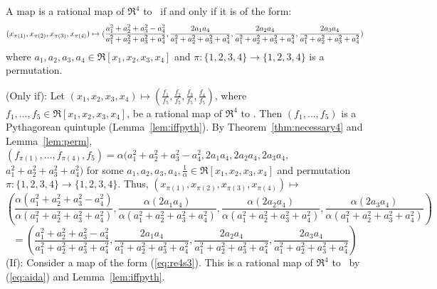 \begin{theorem}
\label{thm:map4}
A map is a rational map of $\Re^4$ to \ if and only if
it is of the form:
\begin{equation}
\label{eq:re4s3}
\footnotesize{(x_{\pi(1)},x_{\pi(2)},x_{\pi(3)},x_{\pi(4)})} \mapsto 
\footnotesize{(\frac{a_1^2 + a_2^2 + a_3^2 - a_4^2}{a_1^2 + a_2^2 + a_3^2 + a_4^2},
	 \frac{2a_1a_4}{a_1^2 + a_2^2 + a_3^2 + a_4^2},
	 \frac{2a_2a_4}{a_1^2 + a_2^2 + a_3^2 + a_4^2},
	 \frac{2a_3a_4}{a_1^2 + a_2^2 + a_3^2 + a_4^2})}
\end{equation}
where $a_1,a_2,a_3,a_4 \in \Re[x_1,x_2,x_3,x_4]$
and $\pi : \{1,2,3,4\} \rightarrow \{1,2,3,4\}$ is a permutation.
\end{theorem}
\prf
(Only if): Let $(x_1,x_2,x_3,x_4) \mapsto 
(\frac{f_1}{f_5},\frac{f_2}{f_5},\frac{f_3}{f_5},\frac{f_4}{f_5})$,
where $f_1,\ldots,f_5 \in \Re[x_1,x_2,x_3,x_4]$, be a rational map
of $\Re^4$ to .
Then $(f_1,\ldots,f_5)$ is a Pythagorean quintuple (Lemma~\ref{lem:iffpyth}).
By Theorem~\ref{thm:necessary4} and Lemma~\ref{lem:perm},
$(f_{\pi(1)},\ldots,f_{\pi(4)},f_5) = \alpha (a_1^2 + a_2^2 + a_3^2 - a_4^2,
2a_1a_4,2a_2a_4,2a_3a_4,$ $a_1^2 + a_2^2 + a_3^2 + a_4^2)$
for some $a_1,a_2,a_3,a_4,\frac{1}{\alpha} \in \Re[x_1,x_2,x_3,x_4]$
and permutation $\pi:\{1,2,3,4\} \rightarrow \{1,2,3,4\}$.
Thus, $(x_{\pi(1)},x_{\pi(2)},x_{\pi(3)},x_{\pi(4)}) \mapsto$
\[
	(\frac{\alpha(a_1^2 + a_2^2 + a_3^2 - a_4^2)}{\alpha(a_1^2 + a_2^2 + a_3^2 + a_4^2)},
	 \frac{\alpha(2a_1a_4)}{\alpha(a_1^2 + a_2^2 + a_3^2 + a_4^2)},
	 \frac{\alpha(2a_2a_4)}{\alpha(a_1^2 + a_2^2 + a_3^2 + a_4^2)},
	 \frac{\alpha(2a_3a_4)}{\alpha(a_1^2 + a_2^2 + a_3^2 + a_4^2)})
\]
\[
= 	(\frac{a_1^2 + a_2^2 + a_3^2 - a_4^2}{a_1^2 + a_2^2 + a_3^2 + a_4^2},
	 \frac{2a_1a_4}{a_1^2 + a_2^2 + a_3^2 + a_4^2},
	 \frac{2a_2a_4}{a_1^2 + a_2^2 + a_3^2 + a_4^2},
	 \frac{2a_3a_4}{a_1^2 + a_2^2 + a_3^2 + a_4^2})
\]
(If): Consider a map of the form (\ref{eq:re4s3}).
This is a rational map of $\Re^4$ to \ by (\ref{eq:aida})
and Lemma~\ref{lem:iffpyth}.
\QED

